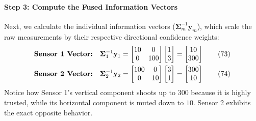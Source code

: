 \documentclass{article}
\begin{document}
\paragraph{Step 3: Compute the Fused Information Vectors}
Next, we calculate the individual information vectors ($\boldsymbol{\Sigma}_m^{-1}\mathbf{y}_m$), which scale the raw measurements by their respective directional confidence weights:
\begin{align}
\text{\textbf{Sensor 1 Vector:}} \quad \boldsymbol{\Sigma}_1^{-1}\mathbf{y}_1 &= \begin{bmatrix} 10 & 0 \\ 0 & 100 \end{bmatrix} \begin{bmatrix} 1 \\ 3 \end{bmatrix} = \begin{bmatrix} 10 \\ 300 \end{bmatrix} \tag{73} \\
\text{\textbf{Sensor 2 Vector:}} \quad \boldsymbol{\Sigma}_2^{-1}\mathbf{y}_2 &= \begin{bmatrix} 100 & 0 \\ 0 & 10 \end{bmatrix} \begin{bmatrix} 3 \\ 1 \end{bmatrix} = \begin{bmatrix} 300 \\ 10 \end{bmatrix} \tag{74}
\end{align}
Notice how Sensor 1's vertical component shoots up to $300$ because it is highly trusted, while its horizontal component is muted down to $10$. Sensor 2 exhibits the exact opposite behavior.
\end{document}
